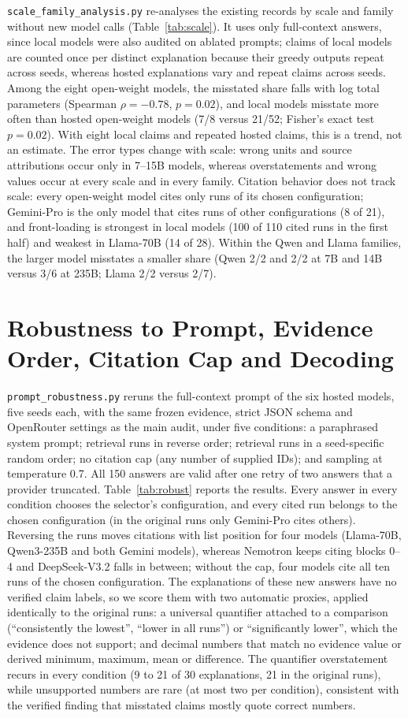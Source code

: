 \texttt{scale\_family\_analysis.py} re-analyses the existing records by scale and family without new model calls (Table~\ref{tab:scale}). It uses only full-context answers, since local models were also audited on ablated prompts; claims of local models are counted once per distinct explanation because their greedy outputs repeat across seeds, whereas hosted explanations vary and repeat claims across seeds. Among the eight open-weight models, the misstated share falls with log total parameters (Spearman $\rho=-0.78$, $p=0.02$), and local models misstate more often than hosted open-weight models (7/8 versus 21/52; Fisher's exact test $p=0.02$). With eight local claims and repeated hosted claims, this is a trend, not an estimate. The error types change with scale: wrong units and source attributions occur only in 7--15B models, whereas overstatements and wrong values occur at every scale and in every family. Citation behavior does not track scale: every open-weight model cites only runs of its chosen configuration; Gemini-Pro is the only model that cites runs of other configurations (8 of 21), and front-loading is strongest in local models (100 of 110 cited runs in the first half) and weakest in Llama-70B (14 of 28). Within the Qwen and Llama families, the larger model misstates a smaller share (Qwen 2/2 and 2/2 at 7B and 14B versus 3/6 at 235B; Llama 2/2 versus 2/7).


\section{Robustness to Prompt, Evidence Order, Citation Cap and Decoding}
\label{app:robust}
\texttt{prompt\_robustness.py} reruns the full-context prompt of the six hosted models, five seeds each, with the same frozen evidence, strict JSON schema and OpenRouter settings as the main audit, under five conditions: a paraphrased system prompt; retrieval runs in reverse order; retrieval runs in a seed-specific random order; no citation cap (any number of supplied IDs); and sampling at temperature 0.7. All 150 answers are valid after one retry of two answers that a provider truncated. Table~\ref{tab:robust} reports the results. Every answer in every condition chooses the selector's configuration, and every cited run belongs to the chosen configuration (in the original runs only Gemini-Pro cites others). Reversing the runs moves citations with list position for four models (Llama-70B, Qwen3-235B and both Gemini models), whereas Nemotron keeps citing blocks 0--4 and DeepSeek-V3.2 falls in between; without the cap, four models cite all ten runs of the chosen configuration. The explanations of these new answers have no verified claim labels, so we score them with two automatic proxies, applied identically to the original runs: a universal quantifier attached to a comparison (``consistently the lowest'', ``lower in all runs'') or ``significantly lower'', which the evidence does not support; and decimal numbers that match no evidence value or derived minimum, maximum, mean or difference. The quantifier overstatement recurs in every condition (9 to 21 of 30 explanations, 21 in the original runs), while unsupported numbers are rare (at most two per condition), consistent with the verified finding that misstated claims mostly quote correct numbers.


